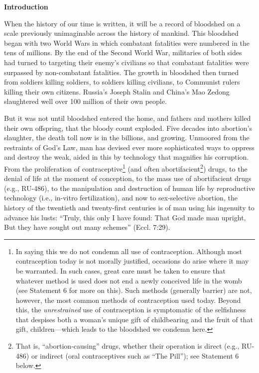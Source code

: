 \documentclass[
]{book}
\begin{document}
\protect\hypertarget{chapter-slug-29-abortion-and-the-church}{\href{}{}}

\textbf{Introduction}

When the history of our time is written, it will be a record of bloodshed on a scale previously unimaginable across the history of mankind. This bloodshed began with two World Wars in which combatant fatalities were numbered in the tens of millions. By the end of the Second World War, militaries of both sides had turned to targeting their enemy's civilians so that combatant fatalities were surpassed by non-combatant fatalities. The growth in bloodshed then turned from soldiers killing soldiers, to soldiers killing civilians, to Communist rulers killing their own citizens. Russia's Joseph Stalin and China's Mao Zedong slaughtered well over 100 million of their own people.

But it was not until bloodshed entered the home, and fathers and mothers killed their own offspring, that the bloody count exploded. Five decades into abortion's slaughter, the death toll now is in the billions, and growing. Unmoored from the restraints of God's Law, man has devised ever more sophisticated ways to oppress and destroy the weak, aided in this by technology that magnifies his corruption. From the proliferation of contraceptive\footnote{In saying this we do not condemn all use of contraception. Although most contraception today is not morally justified, occasions do arise where it may be warranted. In such cases, great care must be taken to ensure that whatever method is used does not end a newly conceived life in the womb (see Statement 6 for more on this). Such methods (generally barrier) are not, however, the most common methods of contraception used today. Beyond this, the \emph{unrestrained} use of contraception is symptomatic of the selfishness that despises both a woman's unique gift of childbearing and the fruit of that gift, children---which leads to the bloodshed we condemn here.} (and often abortifacient\footnote{That is, ``abortion-causing'' drugs, whether their operation is direct (e.g., RU-486) or indirect (oral contraceptives such as ``The Pill''); see Statement 6 below.}) drugs, to the denial of life at the moment of conception, to the mass use of abortifacient drugs (e.g., RU-486), to the manipulation and destruction of human life by reproductive technology (i.e., in-vitro fertilization), and now to sex-selective abortion, the history of the twentieth and twenty-first centuries is of man using his ingenuity to advance his lusts: ``Truly, this only I have found: That God made man upright, But they have sought out many schemes'' (Eccl. 7:29).
\end{document}
